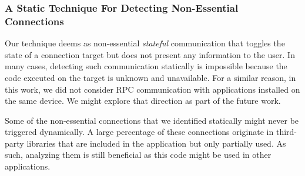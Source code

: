 \subsubsection{A Static Technique For Detecting Non-Essential Connections}
Our technique deems 
%
as non-essential \emph{stateful} communication that toggles
the state of a connection target but does not present any information to the user. 
In many cases, detecting such
communication statically is impossible because the code executed on
the target is unknown and unavailable. 
For a similar reason, in this work, we did not consider RPC communication with applications
installed on the same device. We might explore that direction as part of the future work. 
 
Some of the non-essential connections that we identified statically might never be triggered dynamically. 
A large percentage of these connections originate in  
third-party libraries that are included in the application but only partially used. 
As such, analyzing them is still beneficial as this code might be used in other applications.
